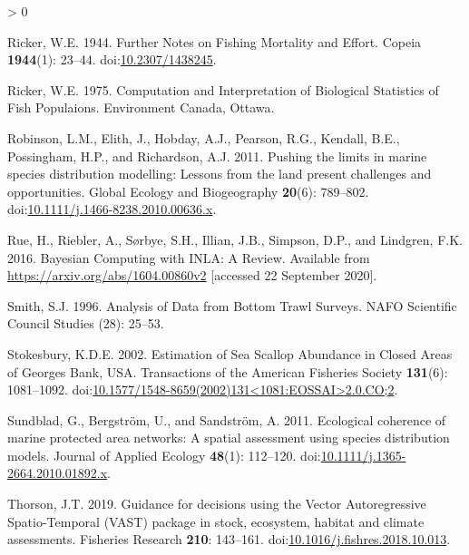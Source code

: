 \documentclass[
]{article}
\newlength{\cslhangindent}
\newenvironment{CSLReferences}[2] %
 {%
  \setlength{\parindent}{0pt}
  \ifodd #1 \everypar{\setlength{\hangindent}{\cslhangindent}}\ignorespaces\fi
  \ifnum #2 > 0
  \setlength{\parskip}{#2\baselineskip}
  \fi
 }%
 {}
\begin{document}
\begin{CSLReferences}{1}{0}
\leavevmode\hypertarget{ref-rickerFurtherNotesFishing1944}{}%
Ricker, W.E. 1944. Further {Notes} on {Fishing Mortality} and {Effort}. Copeia \textbf{1944}(1): 23--44. doi:\href{https://doi.org/10.2307/1438245}{10.2307/1438245}.

\leavevmode\hypertarget{ref-rickerComputationInterpretationBiological1975}{}%
Ricker, W.E. 1975. Computation and {Interpretation} of {Biological Statistics} of {Fish Populaions}. {Environment Canada}, {Ottawa}.

\leavevmode\hypertarget{ref-robinsonPushingLimitsMarine2011}{}%
Robinson, L.M., Elith, J., Hobday, A.J., Pearson, R.G., Kendall, B.E., Possingham, H.P., and Richardson, A.J. 2011. Pushing the limits in marine species distribution modelling: Lessons from the land present challenges and opportunities. Global Ecology and Biogeography \textbf{20}(6): 789--802. doi:\href{https://doi.org/10.1111/j.1466-8238.2010.00636.x}{10.1111/j.1466-8238.2010.00636.x}.

\leavevmode\hypertarget{ref-rueBayesianComputingINLA2016}{}%
Rue, H., Riebler, A., Sørbye, S.H., Illian, J.B., Simpson, D.P., and Lindgren, F.K. 2016. Bayesian {Computing} with {INLA}: {A Review}. Available from \url{https://arxiv.org/abs/1604.00860v2} {[}accessed 22 September 2020{]}.

\leavevmode\hypertarget{ref-smithAnalysisDataBottom1996}{}%
Smith, S.J. 1996. Analysis of {Data} from {Bottom Trawl Surveys}. NAFO Scientific Council Studies (28): 25--53.

\leavevmode\hypertarget{ref-stokesburyEstimationSeaScallop2002}{}%
Stokesbury, K.D.E. 2002. Estimation of {Sea Scallop Abundance} in {Closed Areas} of {Georges Bank}, {USA}. Transactions of the American Fisheries Society \textbf{131}(6): 1081--1092. doi:\href{https://doi.org/10.1577/1548-8659(2002)131\%3C1081:EOSSAI\%3E2.0.CO;2}{10.1577/1548-8659(2002)131\textless1081:EOSSAI\textgreater2.0.CO;2}.

\leavevmode\hypertarget{ref-sundbladEcologicalCoherenceMarine2011}{}%
Sundblad, G., Bergström, U., and Sandström, A. 2011. Ecological coherence of marine protected area networks: A spatial assessment using species distribution models. Journal of Applied Ecology \textbf{48}(1): 112--120. doi:\href{https://doi.org/10.1111/j.1365-2664.2010.01892.x}{10.1111/j.1365-2664.2010.01892.x}.

\leavevmode\hypertarget{ref-thorsonGuidanceDecisionsUsing2019}{}%
Thorson, J.T. 2019. Guidance for decisions using the {Vector Autoregressive Spatio}-{Temporal} ({VAST}) package in stock, ecosystem, habitat and climate assessments. Fisheries Research \textbf{210}: 143--161. doi:\href{https://doi.org/10.1016/j.fishres.2018.10.013}{10.1016/j.fishres.2018.10.013}.


\end{CSLReferences}
\end{document}
